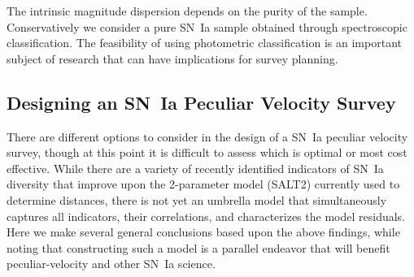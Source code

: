 \documentclass{aastex62}   	%
\begin{document}
\begin{itemize}
The intrinsic magnitude dispersion depends on the purity of the sample. Conservatively we consider
a pure SN~Ia sample obtained through
spectroscopic classification.  The feasibility of using photometric classification is an important subject of research
that can have implications for survey planning.
\end{itemize}

\subsection{Designing an SN~Ia Peculiar Velocity Survey}
There are different options to consider in the design of a SN~Ia peculiar velocity survey, though at this point it is difficult to assess which is optimal
or most cost effective.  While there are a variety
of recently identified indicators of SN~Ia diversity that improve upon the 2-parameter model (SALT2) currently used to determine distances, 
there is not yet an umbrella model that simultaneously captures all indicators, their correlations, and characterizes the model residuals.
Here we  make several general conclusions
based upon the above findings, while noting that 
constructing such a model is a parallel
endeavor that will benefit peculiar-velocity  and other SN~Ia science. 
\end{document}
